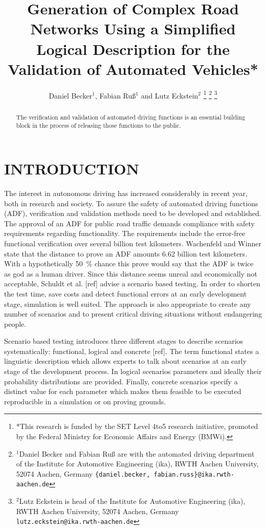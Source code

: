 \documentclass[a4paper, 10pt, conference]{ieeeconf}      %
\title{\LARGE \bf
Generation of Complex Road Networks Using a Simplified Logical Description for the Validation of Automated Vehicles*
}
\author{Daniel Becker$^{1}$, Fabian Ru{\ss}$^{1}$ and Lutz Eckstein$^{2}$%
\thanks{*This research is funded by the SET Level 4to5 research initiative, promoted by the	Federal Ministry for Economic Affairs and Energy (BMWi).}%
\thanks{$^{1}$Daniel Becker and Fabian Ru{\ss} are with the automated driving department of the Institute for Automotive Engineering (ika), RWTH Aachen University, 52074 	Aachen, Germany {\tt\small \{daniel.becker, fabian.russ\}@ika.rwth-aachen.de}}%
\thanks{$^{2}$Lutz Eckstein is head of the Institute for Automotive Engineering (ika), RWTH Aachen University, 52074 Aachen, Germany {\tt\small lutz.eckstein@ika.rwth-aachen.de}}%
}
\begin{document}
\maketitle
\thispagestyle{empty}
\pagestyle{empty}

\begin{abstract} %
The verification and validation of automated driving functions is an essential building block in the process of releasing those functions to the public.  
\end{abstract}

\section{INTRODUCTION}
The interest in autonomous driving has increased considerably in recent year, both in research and society. To assure the safety of automated driving functions (ADF), verification and validation methods need to be developed and established. The approval of an ADF for public road traffic demands compliance with safety requirements regarding functionality. The requirements include the error-free functional verification over several billion test kilometers. Wachenfeld and Winner \cite{wachenfeld2016release} state that the distance to prove an ADF amounts 6.62 billion test kilometers. With a hypothetically 50~\% chance this prove would say that the ADF is twice as god as a human driver. Since this distance seems unreal and economically not acceptable, Schuldt et al. [ref] advise a scenario based testing. In order to shorten the test time, save costs and detect functional errors at an early development stage, simulation is well suited. The approach is also appropriate to create any number of scenarios and to present critical driving situations without endangering people.

Scenario based testing introduces three different stages to describe scenarios systematically: functional, logical and concrete [ref]. The term functional states a linguistic description which allows experts to talk about scenarios at an early stage of the development process. In logical scenarios parameters and ideally their probability distributions are provided. Finally, concrete scenarios specify a distinct value for each parameter which makes them feasible to be executed reproducible in a simulation or on proving grounds. 
\end{document}
